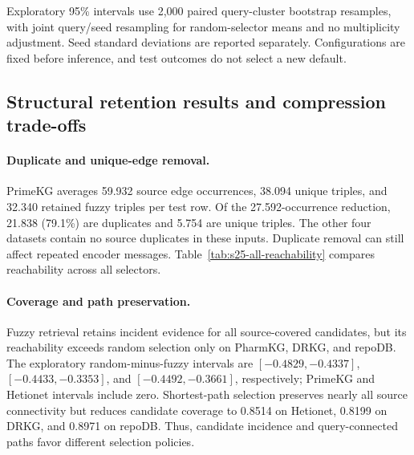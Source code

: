 \begin{revisionblock}
Exploratory 95\% intervals use 2,000 paired query-cluster bootstrap resamples, with joint query/seed resampling for random-selector means and no multiplicity adjustment. Seed standard deviations are reported separately. Configurations are fixed before inference, and test outcomes do not select a new default.

\subsection{Structural retention results and compression trade-offs}
\paragraph{Duplicate and unique-edge removal.}
PrimeKG averages 59.932 source edge occurrences, 38.094 unique triples, and 32.340 retained fuzzy triples per test row. Of the 27.592-occurrence reduction, 21.838 (79.1\%) are duplicates and 5.754 are unique triples. The other four datasets contain no source duplicates in these inputs. Duplicate removal can still affect repeated encoder messages. Table~\ref{tab:s25-all-reachability} compares reachability across all selectors.

\par{}\noindent\begin{minipage}{\linewidth}

\centering\small\setlength{\tabcolsep}{4pt}
\label{tab:s25-all-reachability}


\end{minipage}\par\medskip

\paragraph{Coverage and path preservation.}
Fuzzy retrieval retains incident evidence for all source-covered candidates, but its reachability exceeds random selection only on PharmKG, DRKG, and repoDB. The exploratory random-minus-fuzzy intervals are $[-0.4829,-0.4337]$, $[-0.4433,-0.3353]$, and $[-0.4492,-0.3661]$, respectively; PrimeKG and Hetionet intervals include zero. Shortest-path selection preserves nearly all source connectivity but reduces candidate coverage to 0.8514 on Hetionet, 0.8199 on DRKG, and 0.8971 on repoDB. Thus, candidate incidence and query-connected paths favor different selection policies.


\end{revisionblock}
